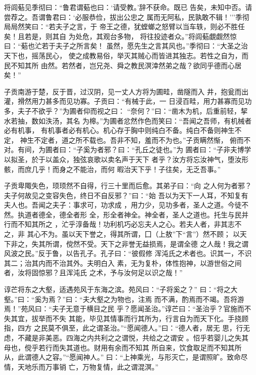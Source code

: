 \documentclass[]{article}
\begin{document}
将闾葂见季彻曰：``鲁君谓葂也曰：`请受教。'辞不获命。既已
告矣，未知中否。请尝荐之。吾谓鲁君曰：`必服恭俭，拔出公忠之
属而无阿私，民孰敢不辑！'''季彻局局然笑曰：``若夫子之言，于
帝王之德，犹螳螂之怒臂以当车轶，则必不胜任矣！且若是，则其自
为处危，其观台多物，
将往投迹者众。''将闾葂覷觑然惊曰：``葂也汒若于夫子之所言矣！
虽然，愿先生之言其风也。''季彻曰：``大圣之治天下也，摇荡民心，
使之成教易俗，举灭其贼心而皆进其独志。若性之自为，而民不知其所
由然。若然者，岂兄尧、舜之教民溟涬然弟之哉？欲同乎德而心居矣！''

子贡南游于楚，反于晋，过汉阴，见一丈人方将为圃畦，凿隧而入
井，抱瓮而出灌，搰然用力甚多而见功寡。子贡曰：``有械于此，一
日浸百畦，用力甚寡而见功多，夫子不欲乎？''为圃者仰而视之曰：
``奈何？''曰：``凿木为机，后重前轻，挈水若抽，数如泆汤，其名
为槔。''为圃者忿然作色而笑曰：``吾闻之吾师，有机械者必有机事，
有机事者必有机心。机心存于胸中则纯白不备。纯白不备则神生不定，
神生不定者，道之所不载也。吾非不知，羞而不为也。''子贡瞒然惭，
俯而不对。有间，为圃者曰：``子奚为者邪？曰：``孔丘之徒也。''为
圃者曰：``子非夫博学以拟圣，於于以盖众，独弦哀歌以卖名声于天下
者乎？汝方将忘汝神气，堕汝形骸，而庶几乎！而身之不能治，而何
暇治天下乎！子往矣，无乏吾事。''

子贡卑陬失色，顼顼然不自得，行三十里而后愈。其弟子曰：``向
之人何为者邪？夫子何故见之变容失色，终日不自反邪？''曰：``始
吾以为天下一人耳，不知复有夫人也。吾闻之夫子：事求可，功求成
，用力少，见功多者，圣人之道。今徒不然。执道者德全，德全者形
全，形全者神全。神全者，圣人之道也。托生与民并行而不知其所之
，汒乎淳备哉！功利机巧必忘夫人之心。若夫人者，非其志不之，非
其心不为。虽以天下誉之，得其所谓，囗（上敖''下``言''）然不顾；
以天下非之，失其所谓，傥然不受。天下之非誉无益损焉，是谓全德
之人哉！我之谓风波之民。''反于鲁，以告孔子。孔子曰：``彼假修
浑沌氏之术者也。识其一，不识其二；治其内而不治其外。夫明白入
素，无为复朴，体性抱神，以游世俗之间者，汝将固惊邪？且浑沌氏
之术，予与汝何足以识之哉！''

谆芒将东之大壑，适遇苑风于东海之滨。苑风曰：``子将奚之？''
曰：``将之大壑。''曰：``奚为焉？''曰：``夫大壑之为物也，注焉
而不满，酌焉而不竭。吾将游焉！''苑风曰：``夫子无意于横目之民
乎？愿闻圣治。''谆芒曰：``圣治乎？官施而不失其宜，拔举而不失
其能，毕见其情事而行其所为，行言自为而天下化。手挠顾指，四方
之民莫不俱至，此之谓圣治。''``愿闻德人。''曰：``德人者，居无
思，行无虑，不藏是非美恶。四海之内共利之之谓悦，共给之之谓安
。怊乎若婴儿之失其母也，傥乎若行而失其道也。财用有余而不知其
所自来，饮食取足而不知其所从，此谓德人之容。''``愿闻神人。''
曰：``上神乘光，与形灭亡，是谓照旷。致命尽情，天地乐而万事销
亡，万物复情，此之谓混溟。''
\end{document}
